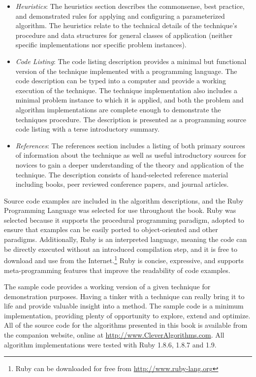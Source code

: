 \begin{bibunit}
\begin{itemize}
	\item \emph{Heuristics}: The heuristics section describes the commonsense, best practice, and demonstrated rules for applying and configuring a parameterized algorithm. The heuristics relate to the technical details of the technique's procedure and data structures for general classes of application (neither specific implementations nor specific problem instances).
	\item \emph{Code Listing}: The code listing description provides a minimal but functional version of the technique implemented with a programming language. The code description can be typed into a computer and provide a working execution of the technique. The technique implementation also includes a minimal problem instance to which it is applied, and both the problem and algorithm implementations are complete enough to demonstrate the techniques procedure. The description is presented as a programming source code listing with a terse introductory summary.
	\item \emph{References}: The references section includes a listing of both primary sources of information about the technique as well as useful introductory sources for novices to gain a deeper understanding of the theory and application of the technique. The description consists of hand-selected reference material including books, peer reviewed conference papers, and journal articles.
\end{itemize}

Source code examples are included in the algorithm descriptions, and the Ruby Programming Language was selected for use throughout the book. Ruby was selected because it supports the procedural programming paradigm, adopted to ensure that examples can be easily ported to object-oriented and other paradigms. Additionally, Ruby is an interpreted language, meaning the code can be directly executed without an introduced compilation step, and it is free to download and use from the Internet.\footnote{Ruby can be downloaded for free from \url{http://www.ruby-lang.org}} Ruby is concise, expressive, and supports meta-programming features that improve the readability of code examples. 

The sample code provides a working version of a given technique for demonstration purposes. Having a tinker with a technique can really bring it to life and provide valuable insight into a method. The sample code is a minimum implementation, providing plenty of opportunity to explore, extend and optimize.
All of the source code for the algorithms presented in this book is available from the companion website, online at \url{http://www.CleverAlgorithms.com}. All algorithm implementations were tested with Ruby 1.8.6, 1.8.7 and 1.9.


\end{bibunit}
